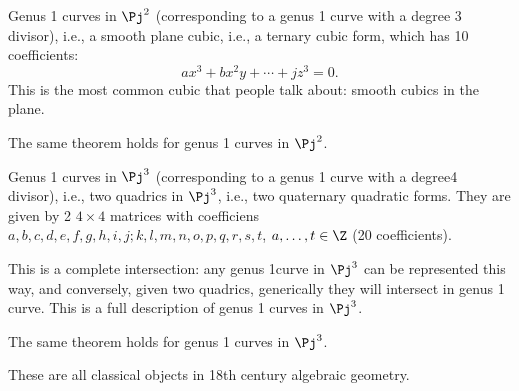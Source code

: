 
\begin{ex}
Genus 1 curves in $\Pj^2$ (corresponding to a genus 1 curve with a degree 3 divisor), i.e., a smooth plane cubic, i.e., a ternary cubic form, which has 10 coefficients:
\[
ax^3 + bx^2y + \cdots + jz^3=0.
\]
This is the most common cubic that people talk about: smooth cubics in the plane. 
\end{ex}
\begin{thm}
The same theorem holds for genus 1 curves in $\Pj^2$.
\end{thm}

\begin{ex}
Genus 1 curves in $\Pj^3$ (corresponding to a genus 1 curve with a degree4 divisor), i.e., two quadrics in $\Pj^3$, i.e., two quaternary quadratic forms. They are given by 2 $4\times 4$ matrices with coefficiens $a,b,c,d,e,f,g,h,i,j;k,l,m,n,o,p,q,r,s,t$, $a,\ldots, t\in \Z$ (20 coefficients). 

This is a complete intersection: any genus 1curve in $\Pj^3$ can be represented this way, and conversely, given two quadrics,  generically they will intersect in genus 1 curve. This is a full description of genus 1 curves in $\Pj^3$.
\end{ex}
\begin{thm}
The same theorem holds for genus 1 curves in $\Pj^3$.
\end{thm}
These are all classical objects in 18th century algebraic geometry. %

